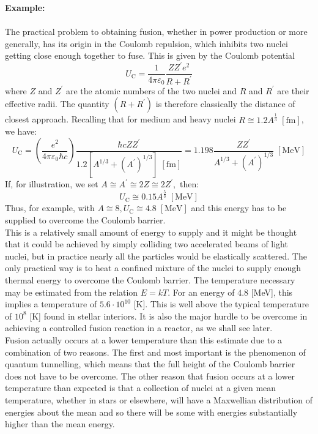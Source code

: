 	\begin{tcolorbox}[colframe=black,colback=white,sharp corners]
	\textbf{{\Large {}}Example:}\\\\
	The practical problem to obtaining fusion, whether in power production or more generally, has its origin in the Coulomb repulsion, which inhibits two nuclei getting close enough together to fuse. This is given by the Coulomb potential
	$$
	U_{\mathrm{C}}=\frac{1}{4 \pi \varepsilon_{0}} \frac{Z Z^{\prime} e^{2}}{R+R^{\prime}}
	$$
	where $Z$ and $Z^{\prime}$ are the atomic numbers of the two nuclei and $R$ and $R^{\prime}$ are their effective radii. The quantity $\left(R+R^{\prime}\right)$ is therefore classically the distance of closest approach. Recalling that for medium and heavy nuclei $R\cong 1.2 A^{\frac{1}{3}}\;[\mathrm{fm}]$, we have:
	$$
	U_{\mathrm{C}}=\left(\frac{e^{2}}{4 \pi \varepsilon_{0} \hbar c}\right) \frac{\hbar c Z Z^{\prime}}{1.2\left[A^{1 / 3}+\left(A^{\prime}\right)^{1 / 3}\right]\; [\text{fm}]}=1.198 \frac{Z Z^{\prime}}{A^{1 / 3}+\left(A^{\prime}\right)^{1 / 3}}\; [\text{MeV}]
	$$
	If, for illustration, we set $A \cong A^{\prime} \cong 2 Z \cong 2 Z^{\prime},$ then:
	$$
	U_{\mathrm{C}} \cong 0.15 A^{\frac{5}{3}}\; [\text{MeV}]
	$$
	Thus, for example, with $A \cong 8, U_{\mathrm{C}} \cong 4.8\; [\text{MeV}]$ and this energy has to be supplied to overcome the Coulomb barrier.\\
	
	This is a relatively small amount of energy to supply and it might be thought that it could be achieved by simply colliding two accelerated beams of light nuclei, but in practice nearly all the particles would be elastically scattered. The only practical way is to heat a confined mixture of the nuclei to supply enough thermal energy to overcome the Coulomb barrier. The temperature necessary may be estimated from the relation $E=k T$. For an energy of $4.8$ [MeV], this implies a temperature of $5.6 \cdot 10^{10}$ [K]. This is well above the typical temperature of $10^{8}$  [K] found in stellar interiors. It is also the major hurdle to be overcome in achieving a controlled fusion reaction in a reactor, as we shall see later.\\

	Fusion actually occurs at a lower temperature than this estimate due to a combination of two reasons. The first and most important is the phenomenon of quantum tunnelling, which means that the full height of the Coulomb barrier does not have to be overcome. The other reason that fusion occurs at a lower temperature than expected is that a collection of nuclei at a given mean temperature, whether in stars or elsewhere, will have a Maxwellian distribution of energies about the mean and so there will be some with energies substantially higher than the mean energy.
	\end{tcolorbox}

